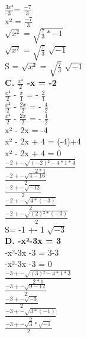 $\frac{3x²}{3}$= $\frac{-7}{3}$ \\

x² = $\frac{-7}{3}$ \\
$\sqrt{x²}$ = $\sqrt{\frac{7}{3} *-1}$ \\
$\sqrt{x²}$ = $\sqrt{\frac{7}{3}}$ $\sqrt{-1}$ \\
S = $\sqrt{x²}$ = $\sqrt{\frac{7}{3}}$ $\sqrt{-1}$ \\

\vspace{5mm} %
\textbf{C. $\frac{x²}{2}$ -x = -2} \\

$\frac{x²}{2}$ - $\frac{x}{1}$ = - $\frac{2}{1}$\\

$\frac{x²}{2}$ - $\frac{2x}{2}$ = - $\frac{4}{2}$\\

$\frac{x²}{2}$ - $\frac{2x}{2}$ = - $\frac{4}{2}$\\

x² - 2x = -4 \\
x² - 2x + 4 = (-4)+4 \\
x² - 2x + 4 = 0 \\

$\frac{-2+-\sqrt{(-2)²-4*1*4}}{2*1}$ \\
$\frac{-2+-\sqrt{4 - 16}}{2}$ \\
$\frac{-2+-\sqrt{-12}}{2}$ \\
$\frac{-2+-\sqrt{4*(-3)}}{2}$ \\
$\frac{-2+-\sqrt{(2)²*(-3)}}{2}$ \\
S= -1 +- 1 $\sqrt{-3}$ \\


\newpage
\textbf{D. -x²-3x = 3} \\

-x²-3x -3 = 3-3 \\
-x²-3x -3 = 0 \\

$\frac{-3+-\sqrt{(3)²-4*1*3}}{2*1}$ \\

$\frac{-3+-\sqrt{9-12}}{2}$ \\

$\frac{-3+-\sqrt{-3}}{2}$ \\

$\frac{-3+-\sqrt{3 * (-1)}}{2}$ \\

$\frac{-3+-\sqrt{3} * \sqrt{-1}}{2}$ \\

